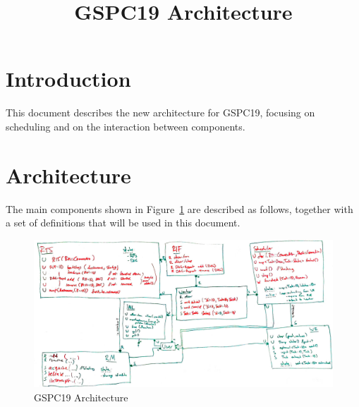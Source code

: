 \documentclass[10pt]{article}
\title{GSPC19 Architecture}
\date{}
\begin{document}
\maketitle


\section{Introduction}
This document describes the new architecture for GSPC19, focusing on scheduling
and on the interaction between components.


\section{Architecture}
The main components shown in Figure~\ref{fig:architecture} are described as follows, together with a set of definitions that will be used in this document.
\begin{figure}[t]
    \centering
    \includegraphics[width=.9\linewidth]{./api_overview.jpg}
    \caption{GSPC19 Architecture}
    \label{fig:architecture}
\end{figure}
%
\end{document}
